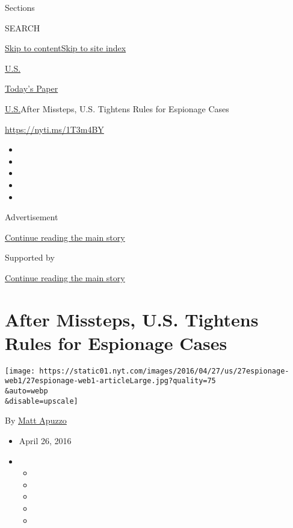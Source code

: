 Sections

SEARCH

\protect\hyperlink{site-content}{Skip to
content}\protect\hyperlink{site-index}{Skip to site index}

\href{https://www.nytimes.com/section/us}{U.S.}

\href{https://myaccount.nytimes.com/auth/login?response_type=cookie\&client_id=vi}{}

\href{https://www.nytimes.com/section/todayspaper}{Today's Paper}

\href{/section/us}{U.S.}\textbar{}After Missteps, U.S. Tightens Rules
for Espionage Cases

\url{https://nyti.ms/1T3m4BY}

\begin{itemize}
\item
\item
\item
\item
\item
\end{itemize}

Advertisement

\protect\hyperlink{after-top}{Continue reading the main story}

Supported by

\protect\hyperlink{after-sponsor}{Continue reading the main story}

\hypertarget{after-missteps-us-tightens-rules-for-espionage-cases}{%
\section{After Missteps, U.S. Tightens Rules for Espionage
Cases}\label{after-missteps-us-tightens-rules-for-espionage-cases}}

\texttt{[image: https://static01.nyt.com/images/2016/04/27/us/27espionage-web1/27espionage-web1-articleLarge.jpg?quality=75\\\&auto=webp\\\&disable=upscale]}

By \href{http://www.nytimes.com/by/matt-apuzzo}{Matt Apuzzo}

\begin{itemize}
\item
  April 26, 2016
\item
  \begin{itemize}
  \item
  \item
  \item
  \item
  \item
  \end{itemize}
\end{itemize}

